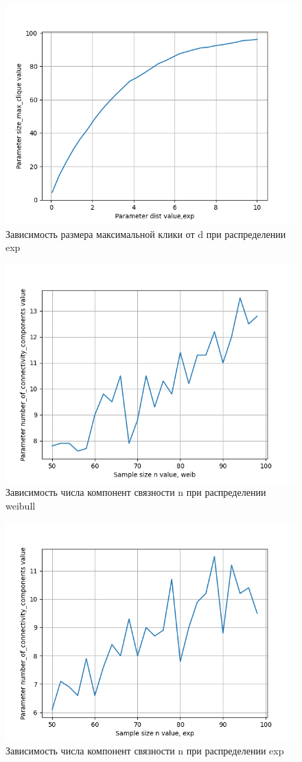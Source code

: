 \documentclass{HSEtitle}
\begin{document}
\begin{figure}[h]
    \centering
    \includegraphics[width=0.65\linewidth]{exp_d.png}
    \caption{Зависимость размера максимальной клики от d при распределении exp}
    \label{fig:enter-label}
\end{figure}

\begin{figure}[h]
    \centering
    \includegraphics[width=0.65\linewidth]{weib_n_knn.png}
    \caption{Зависимость числа компонент связности n при распределении weibull}
    \label{fig:enter-label}
\end{figure}

\begin{figure}[h]
    \centering
    \includegraphics[width=0.65\linewidth]{exp_n_knn.png}
    \caption{Зависимость числа компонент связности n при распределении exp}
    \label{fig:enter-label}
\end{figure}
\end{document}
